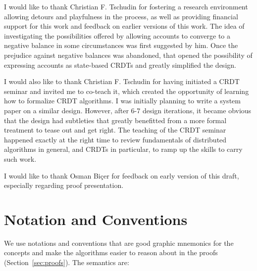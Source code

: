 \documentclass[9pt]{article}   	%
\begin{document}
I would like to thank Christian F. Tschudin for fostering a research environment allowing detours and playfulness in the process, as well as providing financial support for this work and feedback on earlier versions of this work. The idea of investigating the possibilities offered by allowing accounts to converge to a negative balance in some circumstances was first suggested by him. Once the prejudice against negative balances was abandoned, that opened the possibility of expressing accounts as state-based CRDTs and greatly simplified the design.

I would also like to thank Christian F. Tschudin for having initiated a CRDT seminar and invited me to co-teach it, which created the opportunity of learning how to formalize CRDT algorithms. I was initially planning to write a system paper on a similar design. However, after 6-7 design iterations, it became obvious that the design had subtleties that greatly benefitted from a more formal treatment to tease out and get right. The teaching of the CRDT seminar happened exactly at the right time to review fundamentals of distributed algorithms in general, and CRDTs in particular, to ramp up the skills to carry such work.

I would like to thank Osman Biçer for feedback on early version of this draft, especially regarding proof presentation.



\newpage




\newpage
\appendix




\section{Notation and Conventions}
\label{apdx:notation}

We use notations and conventions that are good graphic mnemonics for the concepts and make the algorithms easier to reason about in the proofs (Section~\ref{sec:proofs}). The semantics are:
\end{document}
